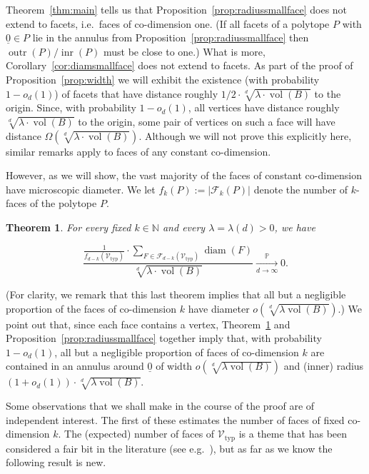 \documentclass[11pt]{article}%
\newtheorem{theorem}{Theorem} %
\newcommand{\Fcal}[0]{\ensuremath{{\mathcal F}}}
\newcommand{\Vcal}[0]{\ensuremath{{\mathcal V}}}
\newcommand{\eN}[0]{\ensuremath{ \mathbb N}}
\newcommand{\Pee}[0]{\ensuremath{{\mathbb P}}}
\newcommand{\orig}{\underline{0}}
\DeclareMathOperator{\vol}{vol}
\DeclareMathOperator{\diam}{diam}
\DeclareMathOperator{\inr}{inr}
\DeclareMathOperator{\outr}{outr}
\newcommand{\Vtyp}[0]{\Vcal_{\text{typ}}}
\begin{document}
Theorem~\ref{thm:main} tells us that Proposition~\ref{prop:radiussmallface} 
does not extend to facets, i.e.~faces of co-dimension one. (If all facets of a polytope $P$ with $\orig \in P$ lie in the annulus from Proposition~\ref{prop:radiussmallface} then 
$\outr(P)/\inr(P)$ must be close to one.)
What is more, Corollary~\ref{cor:diamsmallface} does not extend to facets. 
As part of the proof of Proposition~\ref{prop:width} we will exhibit the existence (with probability $1-o_d(1)$)
of facets that have distance roughly $1/2 \cdot \sqrt[d]{\lambda\cdot\vol(B)}$ to the origin.
Since, with probability $1-o_d(1)$, all vertices have distance roughly $\sqrt[d]{\lambda\cdot\vol(B)}$ to the origin,
some pair of vertices 
on such a face will have distance $\Omega\left( \sqrt[d]{\lambda\cdot\vol(B)} \right)$.
Although we will not prove this explicitly here, similar remarks apply to faces of any constant co-dimension.

However, as we will show, the vast majority of the faces of constant co-dimension have 
microscopic diameter. We let $f_k(P) := |\Fcal_k(P)|$ denote the number of $k$-faces of the polytope $P$.

\begin{theorem}\label{thm:diambigface}
For every fixed $k \in \eN$ and every $\lambda=\lambda(d)>0$, we have 

$$ \frac{{\displaystyle \frac{1}{f_{d-k}(\Vtyp)}}\cdot\sum_{F \in \Fcal_{d-k}(\Vtyp)} \diam(F)}{\sqrt[d]{\lambda\cdot\vol(B)}} 
\xrightarrow[d\to\infty]{\Pee} 0.
$$ 
\end{theorem}

\noindent
(For clarity, we remark that this last theorem implies that all but a negligible proportion of the faces of co-dimension $k$ 
have diameter $o\left( \sqrt[d]{\lambda \vol(B)} \right)$.)
We point out that, since each face contains a vertex, Theorem~\ref{thm:diambigface} and Proposition~\ref{prop:radiussmallface} 
together imply that, with probability 
$1-o_d(1)$, all but a negligible proportion of faces of co-dimension $k$ are contained 
in an annulus around $\orig$ of width $o\left( \sqrt[d]{\lambda \vol(B)} \right)$ and 
(inner) radius $(1+o_d(1)) \cdot \sqrt[d]{\lambda \vol(B)}$.

Some observations that we shall make in the course of the proof are of independent interest.
The first of these estimates the number of faces of fixed co-dimension $k$.
The (expected) number of faces of $\Vtyp$ is a theme that has been considered a fair bit 
in the literature (see e.g.~\cite{HoermannEtal,ZakharAdvMath}), but as far as we know the following result is new.
\end{document}
